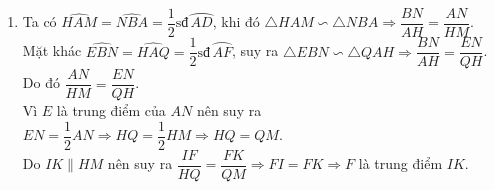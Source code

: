\begin{bt}
{\begin{enumerate}
\begin{enumerate}
				Vì $\widehat{BHE} = \widehat{PAH}$ (cùng phụ góc $\widehat{APH}$) nên $\widehat{BHE} = \widehat{BFH} \Rightarrow \triangle BHE \backsim \triangle BFH$.\\
				Do đó $\dfrac{BH}{BF} = \dfrac{BE}{BH} \Rightarrow BH^2 = BE \cdot BF$.\\
				Ta lại có $\widehat{AEF} = \widehat{AHF}$ (do $AEFH$ là tứ giác nội tiếp).\\
				Vì $\widehat{BQF} = \widehat{AHF}$ (cùng phụ góc $\widehat{HAQ}$) và $\widehat{BEP} = \widehat{AEF}$ (đối đỉnh) nên $\widehat{BEP} = \widehat{BQF} \Rightarrow \triangle BEP \backsim \triangle BQF$.\\
				Do đó $\dfrac{BE}{BQ} = \dfrac{BP}{BF} \Rightarrow BE \cdot BF = BP \cdot BQ$.\\
				Vậy $BH^2=BP \cdot BQ$.
			\end{enumerate}
			\item Ta có $\widehat{HAM} = \widehat{NBA} = \dfrac{1}{2} \text{sđ}\,\wideparen{AD}$, khi đó $\triangle HAM \backsim \triangle NBA \Rightarrow \dfrac{BN}{AH} = \dfrac{AN}{HM}$.\\
			Mặt khác $\widehat{EBN} = \widehat{HAQ} = \dfrac{1}{2}\text{sđ}\,\wideparen{AF}$, suy ra $\triangle EBN \backsim \triangle QAH \Rightarrow \dfrac{BN}{AH} = \dfrac{EN}{QH}$.\\
			Do đó $\dfrac{AN}{HM} = \dfrac{EN}{QH}$.\\
			Vì $E$ là trung điểm của $AN$ nên suy ra $EN = \dfrac{1}{2}AN \Rightarrow HQ = \dfrac{1}{2}HM \Rightarrow HQ = QM$.\\
			Do $IK \parallel HM$ nên suy ra $\dfrac{IF}{HQ} = \dfrac{FK}{QM} \Rightarrow FI = FK \Rightarrow F$ là trung điểm $IK$.
		\end{enumerate}
	}
\end{bt}


